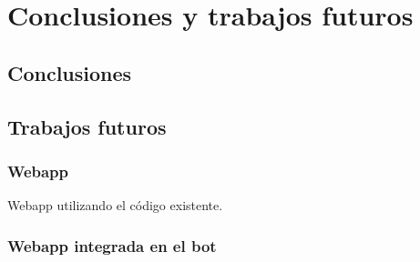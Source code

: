 \chapter{Conclusiones y trabajos futuros}

\section{Conclusiones}



\section{Trabajos futuros}

\subsection{Webapp}
Webapp utilizando el código existente.

\subsection{Webapp integrada en el bot}
